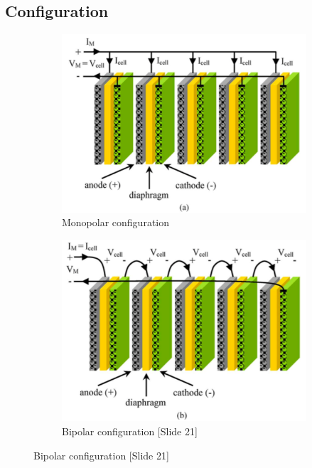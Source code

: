 \subsection{Configuration}
\begin{figure}[ht]
        \begin{subfigure}{0.49\textwidth}
            \centering
            \includegraphics[width=\textwidth]{monopolar.png}
            \caption{Monopolar configuration}
        \end{subfigure}
        \hspace*{\fill} %
        \begin{subfigure}{0.49\textwidth}
        \includegraphics[width=\textwidth]{bipolar.png}
        \caption{Bipolar configuration [Slide 21]} 
        \end{subfigure}
    \end{figure}

